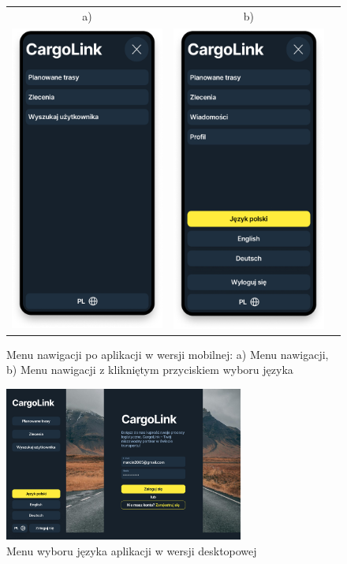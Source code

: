 \begin{figure}[H]
	\centering
        \begin{tabular}{@{}ccc@{}}
            a) & b)\\
		\includegraphics[width=0.3\linewidth]{rozdzial1/menu_m.png} &
		\includegraphics[width=0.3\linewidth]{rozdzial1/menu_język_m.png}
		\end{tabular}
	\caption{Menu nawigacji po aplikacji w wersji mobilnej: a) Menu nawigacji, b) Menu nawigacji z klikniętym przyciskiem wyboru języka}
	\label{Rys. fig:Menu nawigacji po aplikacji - ab}
\end{figure}
\begin{figure}[H]
 \centering
  \includegraphics[width=0.7\textwidth]{rozdzial1/menu_jezyk_d.jpg}
 \caption{Menu wyboru języka aplikacji w wersji desktopowej}
 \label{Rys. fig:Wybór języka aplikacji - desktop}
\end{figure}

